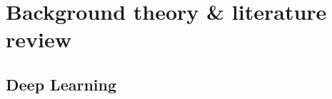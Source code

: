 \chapter{Background theory \& literature review} \label{Chapter: Theory}




\section{Deep Learning}

